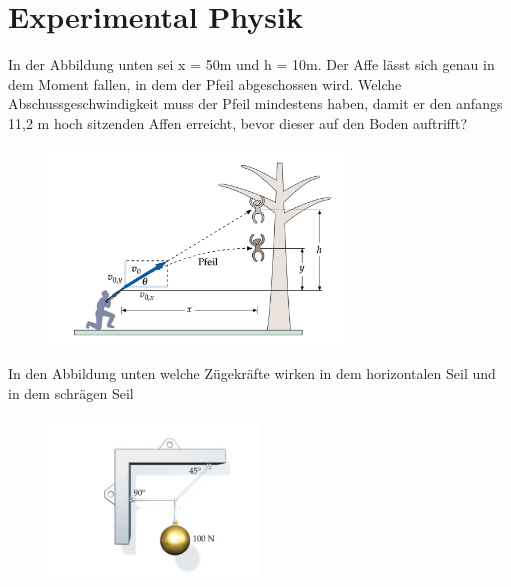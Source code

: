 \documentclass[addpoints,12pt]{exam} %
\begin{document}
\author{Shah Rrks}
\section*{Experimental Physik}
\begin{questions}
\question In der Abbildung unten sei x = 50m und h = 10m. Der Affe lässt sich genau in dem Moment fallen, in dem der Pfeil abgeschossen wird. Welche Abschussgeschwindigkeit muss der Pfeil mindestens haben, damit er den anfangs 11,2 m hoch sitzenden Affen erreicht, bevor dieser auf den Boden auftrifft?

\begin{figure}[h]
\centering
\includegraphics[width=0.7\textwidth]{auf1}
\end{figure}

\makeemptybox{4in}
\pagebreak
\question In den Abbildung unten welche Zügekräfte wirken in dem horizontalen Seil und in dem schrägen Seil



\begin{figure}[h]
\includegraphics[width=0.5\textwidth]{auf2}
\label{fig:zu Aufgabe 2}
\end{figure}


\end{questions}
\end{document}
